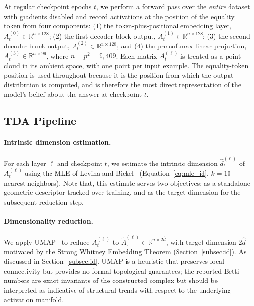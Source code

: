 At regular checkpoint epochs $t$, we perform a forward pass over the
\emph{entire} dataset with gradients disabled and record activations
at the position of the equality token from four components:
(1) the token-plus-positional embedding layer,
$A^{(0)}_t \in \mathbb{R}^{n \times 128}$;
(2) the first decoder block output,
$A^{(1)}_t \in \mathbb{R}^{n \times 128}$;
(3) the second decoder block output,
$A^{(2)}_t \in \mathbb{R}^{n \times 128}$; and
(4) the pre-softmax linear projection,
$A^{(3)}_t \in \mathbb{R}^{n \times 99}$,
where $n = p^2 = 9{,}409$. Each matrix $A^{(\ell)}_t$ is treated as a
point cloud in its ambient space, with one point per input example.
The equality-token position is used throughout because it is the
position from which the output distribution is computed, and is
therefore the most direct representation of the model's belief about
the answer at checkpoint $t$.

\subsection{TDA Pipeline}
\label{subsec:tda_pipeline}

\paragraph{Intrinsic dimension estimation.}
For each layer $\ell$ and checkpoint $t$, we estimate the intrinsic
dimension $\hat{d}^{(\ell)}_t$ of $A^{(\ell)}_t$ using the MLE of
Levina and Bickel~\cite{LevinaBickel} (Equation~\ref{eq:mle_id},
$k = 10$ nearest neighbors). Note that, this estimate serves two objectives: as a
standalone geometric descriptor tracked over training, and as the target dimension for the
subsequent reduction step.

\paragraph{Dimensionality reduction.}
We apply UMAP~\cite{McInnes2018} to reduce $A^{(\ell)}_t$ to $\tilde{A}^{(\ell)}_t \in \mathbb{R}^{n \times 2\hat{d}}$, with target dimension $2\hat{d}$ motivated by the Strong Whitney Embedding Theorem (Section~\ref{subsec:id}). As discussed in Section~\ref{subsec:id}, UMAP is a heuristic that preserves local connectivity but provides no formal topological guarantees; the reported Betti numbers are exact invariants of the constructed complex but should be interpreted as indicative of structural trends with respect to the underlying activation manifold.

